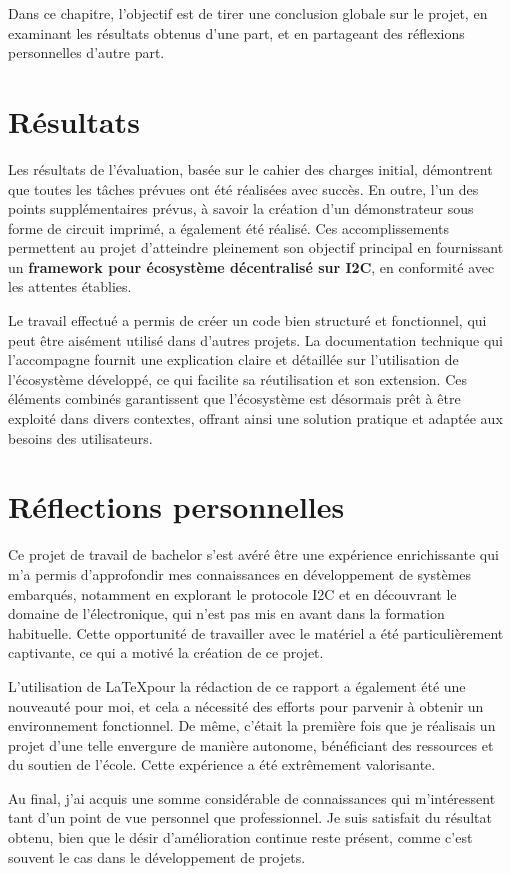 Dans ce chapitre, l'objectif est de tirer une conclusion globale sur le projet, en examinant les résultats obtenus d'une part, et en partageant des réflexions personnelles d'autre part.

\section{Résultats}

Les résultats de l'évaluation, basée sur le cahier des charges initial, démontrent que toutes les tâches prévues ont été réalisées avec succès.
En outre, l'un des points supplémentaires prévus, à savoir la création d'un démonstrateur sous forme de circuit imprimé, a également été réalisé.
Ces accomplissements permettent au projet d'atteindre pleinement son objectif principal en fournissant un \textbf{\gls{framework} pour écosystème décentralisé sur I2C}, en conformité avec les attentes établies.

Le travail effectué a permis de créer un code bien structuré et fonctionnel, qui peut être aisément utilisé dans d'autres projets.
La documentation technique qui l'accompagne fournit une explication claire et détaillée sur l'utilisation de l'écosystème développé, ce qui facilite sa réutilisation et son extension.
Ces éléments combinés garantissent que l'écosystème est désormais prêt à être exploité dans divers contextes, offrant ainsi une solution pratique et adaptée aux besoins des utilisateurs.

\section{Réflections personnelles}

Ce projet de travail de bachelor s'est avéré être une expérience enrichissante qui m'a permis d'approfondir mes connaissances en développement de systèmes embarqués, notamment en explorant le protocole I2C et en découvrant le domaine de l'électronique, qui n'est pas mis en avant dans la formation habituelle.
Cette opportunité de travailler avec le matériel a été particulièrement captivante, ce qui a motivé la création de ce projet.

L'utilisation de \LaTeX pour la rédaction de ce rapport a également été une nouveauté pour moi, et cela a nécessité des efforts pour parvenir à obtenir un environnement fonctionnel.
De même, c'était la première fois que je réalisais un projet d'une telle envergure de manière autonome, bénéficiant des ressources et du soutien de l'école.
Cette expérience a été extrêmement valorisante.

Au final, j'ai acquis une somme considérable de connaissances qui m'intéressent tant d'un point de vue personnel que professionnel.
Je suis satisfait du résultat obtenu, bien que le désir d'amélioration continue reste présent, comme c'est souvent le cas dans le développement de projets.


\vfil
\hspace{8cm}\makeatletter\@author\makeatother\par
\hspace{8cm}\begin{minipage}{5cm}
    \printsignature
\end{minipage}
\clearpage